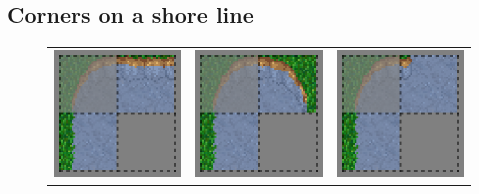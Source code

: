 \newpage
\subsection{Corners on a shore line}\label{example_tmw_grass_water_corners}
\begin{figure}
  \begin{center}
		\begin{tabular}{c c c}
		\includegraphics[scale=1]{Example/TheManaWorld/shorelinecorners/pattern0.eps} & \includegraphics[scale=1]{Example/TheManaWorld/shorelinecorners/pattern1.eps} & \includegraphics[scale=1]{Example/TheManaWorld/shorelinecorners/pattern2.eps} \\

\end{tabular}
\end{center}
\end{figure}
